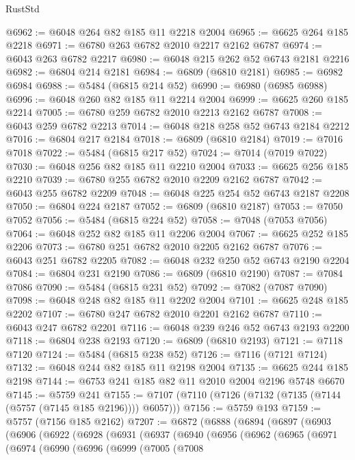 \begin{lexlean}{RustStd}
\begin{coremodule}
@6962 := @6048 @264 @82 @185 @11 @2218 @2004
@6965 := @6625 @264 @185 @2218
@6971 := @6780 @263 @6782 @2010 @2217 @2162 @6787
@6974 := @6043 @263 @6782 @2217
@6980 := @6048 @215 @262 @52 @6743 @2181 @2216
@6982 := @6804 @214 @2181
@6984 := @6809 (@6810 @2181)
@6985 := @6982 @6984
@6988 := @5484 (@6815 @214 @52)
@6990 := @6980 (@6985 @6988)
@6996 := @6048 @260 @82 @185 @11 @2214 @2004
@6999 := @6625 @260 @185 @2214
@7005 := @6780 @259 @6782 @2010 @2213 @2162 @6787
@7008 := @6043 @259 @6782 @2213
@7014 := @6048 @218 @258 @52 @6743 @2184 @2212
@7016 := @6804 @217 @2184
@7018 := @6809 (@6810 @2184)
@7019 := @7016 @7018
@7022 := @5484 (@6815 @217 @52)
@7024 := @7014 (@7019 @7022)
@7030 := @6048 @256 @82 @185 @11 @2210 @2004
@7033 := @6625 @256 @185 @2210
@7039 := @6780 @255 @6782 @2010 @2209 @2162 @6787
@7042 := @6043 @255 @6782 @2209
@7048 := @6048 @225 @254 @52 @6743 @2187 @2208
@7050 := @6804 @224 @2187
@7052 := @6809 (@6810 @2187)
@7053 := @7050 @7052
@7056 := @5484 (@6815 @224 @52)
@7058 := @7048 (@7053 @7056)
@7064 := @6048 @252 @82 @185 @11 @2206 @2004
@7067 := @6625 @252 @185 @2206
@7073 := @6780 @251 @6782 @2010 @2205 @2162 @6787
@7076 := @6043 @251 @6782 @2205
@7082 := @6048 @232 @250 @52 @6743 @2190 @2204
@7084 := @6804 @231 @2190
@7086 := @6809 (@6810 @2190)
@7087 := @7084 @7086
@7090 := @5484 (@6815 @231 @52)
@7092 := @7082 (@7087 @7090)
@7098 := @6048 @248 @82 @185 @11 @2202 @2004
@7101 := @6625 @248 @185 @2202
@7107 := @6780 @247 @6782 @2010 @2201 @2162 @6787
@7110 := @6043 @247 @6782 @2201
@7116 := @6048 @239 @246 @52 @6743 @2193 @2200
@7118 := @6804 @238 @2193
@7120 := @6809 (@6810 @2193)
@7121 := @7118 @7120
@7124 := @5484 (@6815 @238 @52)
@7126 := @7116 (@7121 @7124)
@7132 := @6048 @244 @82 @185 @11 @2198 @2004
@7135 := @6625 @244 @185 @2198
@7144 := @6753 @241 @185 @82 @11 @2010 @2004 @2196 @5748 @6670
@7145 := @5759 @241
@7155 := @7107 (@7110 (@7126 (@7132 (@7135 (@7144 (@5757 (@7145 @185 @2196)))) @6057)))
@7156 := @5759 @193
@7159 := @5757 (@7156 @185 @2162)
@7207 := @6872
    (@6888
      (@6894
        (@6897
          (@6903
            (@6906
              (@6922
                (@6928
                  (@6931
                    (@6937
                      (@6940
                        (@6956
                          (@6962
                            (@6965
                              (@6971
                                (@6974
                                  (@6990
                                    (@6996
                                      (@6999
                                        (@7005
                                          (@7008

\end{coremodule}
\end{lexlean}
